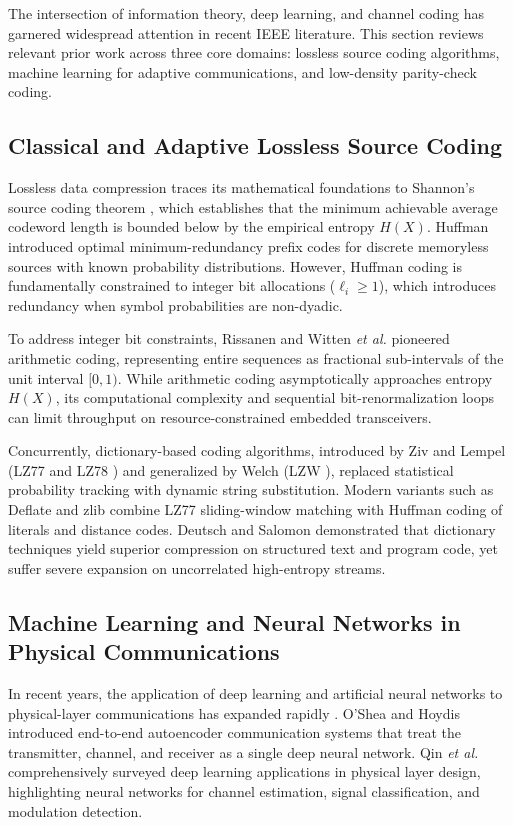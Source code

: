 \documentclass[conference]{IEEEtran}
\begin{document}
The intersection of information theory, deep learning, and channel coding has garnered widespread attention in recent IEEE literature. This section reviews relevant prior work across three core domains: lossless source coding algorithms, machine learning for adaptive communications, and low-density parity-check coding.

\subsection{Classical and Adaptive Lossless Source Coding}
Lossless data compression traces its mathematical foundations to Shannon's source coding theorem \cite{shannon1948}, which establishes that the minimum achievable average codeword length is bounded below by the empirical entropy $H(X)$. Huffman \cite{huffman1952} introduced optimal minimum-redundancy prefix codes for discrete memoryless sources with known probability distributions. However, Huffman coding is fundamentally constrained to integer bit allocations ($\ell_i \ge 1$), which introduces redundancy when symbol probabilities are non-dyadic.

To address integer bit constraints, Rissanen \cite{rissanen1979} and Witten \textit{et al.} \cite{witten1987} pioneered arithmetic coding, representing entire sequences as fractional sub-intervals of the unit interval $[0, 1)$. While arithmetic coding asymptotically approaches entropy $H(X)$, its computational complexity and sequential bit-renormalization loops can limit throughput on resource-constrained embedded transceivers. 

Concurrently, dictionary-based coding algorithms, introduced by Ziv and Lempel (LZ77 \cite{ziv1977} and LZ78 \cite{ziv1978}) and generalized by Welch (LZW \cite{welch1984}), replaced statistical probability tracking with dynamic string substitution. Modern variants such as Deflate and zlib \cite{deutsch1996} combine LZ77 sliding-window matching with Huffman coding of literals and distance codes. Deutsch \cite{deutsch1996} and Salomon \cite{salomon2007} demonstrated that dictionary techniques yield superior compression on structured text and program code, yet suffer severe expansion on uncorrelated high-entropy streams.

\subsection{Machine Learning and Neural Networks in Physical Communications}
In recent years, the application of deep learning and artificial neural networks to physical-layer communications has expanded rapidly \cite{o_shea2017,qin2019}. O'Shea and Hoydis \cite{o_shea2017} introduced end-to-end autoencoder communication systems that treat the transmitter, channel, and receiver as a single deep neural network. Qin \textit{et al.} \cite{qin2019} comprehensively surveyed deep learning applications in physical layer design, highlighting neural networks for channel estimation, signal classification, and modulation detection.
\end{document}
